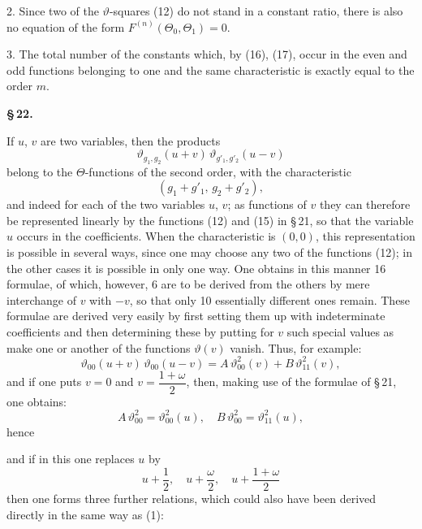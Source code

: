 
2. Since two of the $\vartheta$-squares (12) do not stand in a constant ratio, there is also no equation of the form $F^{(n)}(\Theta_0,\Theta_1) = 0$.

3. The total number of the constants which, by (16), (17), occur in the even and odd functions belonging to one and the same characteristic is exactly equal to the order $m$.

\begin{center}
\textbf{\S\,22. }
\end{center}

If $u$, $v$ are two variables, then the products
\[
\vartheta_{g_1,g_2}(u+v)\,\vartheta_{g'_1,g'_2}(u-v)
\]
belong to the $\Theta$-functions of the second order, with the characteristic
\[
(g_1+g'_1,\,g_2+g'_2),
\]
and indeed for each of the two variables $u$, $v$; as functions of $v$ they can therefore be represented linearly by the functions (12) and (15) in \S\,21, so that the variable $u$ occurs in the coefficients. When the characteristic is $(0,0)$, this representation is possible in several ways, since one may choose any two of the functions (12); in the other cases it is possible in only one way. One obtains in this manner 16 formulae, of which, however, 6 are to be derived from the others by mere interchange of $v$ with $-v$, so that only 10 essentially different ones remain. These formulae are derived very easily by first setting them up with indeterminate coefficients and then determining these by putting for $v$ such special values as make one or another of the functions $\vartheta(v)$ vanish. Thus, for example:
\[
\vartheta_{00}(u+v)\,\vartheta_{00}(u-v) = A\,\vartheta_{00}^2(v) + B\,\vartheta_{11}^2(v),
\]
and if one puts $v=0$ and $v=\dfrac{1+\omega}{2}$, then, making use of the formulae of \S\,21, one obtains:
\[
A\,\vartheta_{00}^2 = \vartheta_{00}^2(u), \quad B\,\vartheta_{00}^2 = \vartheta_{11}^2(u),
\]
hence

and if in this one replaces $u$ by
\[
u+\frac{1}{2}, \quad u+\frac{\omega}{2}, \quad u+\frac{1+\omega}{2}
\]
then one forms three further relations, which could also have been derived directly in the same way as (1):
